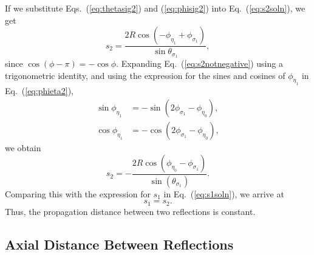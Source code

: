 \documentclass[a4paper,twocolumn,superscriptaddress]{revtex4-1}
\begin{document}
{If we substitute Eqs.~(\ref{eq:thetasig2}) and (\ref{eq:phisig2}) into Eq.~(\ref{eq:s2soln}), we get
\begin{equation}
\label{eq:s2notnegative}
  s_2 = \dfrac{2R \cos (- \phi_{ \eta_1 } + \phi_{ \sigma_1 }) }{\sin \theta_{ \sigma_1 }} ,
\end{equation}
since $\cos(\phi-\pi)=-\cos \phi$.
Expanding Eq.~(\ref{eq:s2notnegative}) using a trigonometric identity,
and using the expression for the sines and cosines of $\phi_{ \eta_1 }$ in Eq.~(\ref{eq:phieta2}), 
\begin{align}
\sin \phi_{ \eta_1 } &= 
- \sin ( 2\phi_{ \sigma_1 } - \phi_{ \eta_0 })  ,
\\
\cos \phi_{ \eta_1 } &= 
 - \cos ( 2\phi_{ \sigma_1 } - \phi_{ \eta_0 }) ,
\end{align}
we obtain
\begin{equation}
\label{eq:s2equals1}
  s_2 = - \dfrac{2R \cos ( \phi_{ \eta_0 } - \phi_{ \sigma_1 }) }{\sin (\theta_{ \sigma_1 })} .
\end{equation}
Comparing this with the expression for $s_1$ in Eq.~(\ref{eq:s1soln}), we arrive at
\begin{equation}
\label{eq:s1iss2}
s_1 = s_2 .
\end{equation}
Thus, the propagation distance between two reflections is constant.

\subsection{Axial Distance Between Reflections}

}
\end{document}
